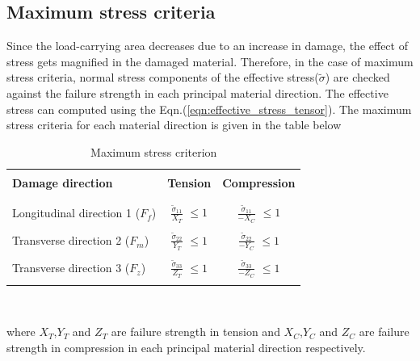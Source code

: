 \documentclass[a4paper,12pt,twoside]{report}
\begin{document}
\subsection{Maximum stress criteria}\label{Maximum stress criteria}
\indent\indent\indent  Since the load-carrying area decreases due to an increase in damage, the effect of stress gets magnified in the damaged material. Therefore, in the case of maximum stress criteria, normal stress components of the effective stress($\tilde{\sigma}$) are checked against the failure strength in each principal material direction. The effective stress can computed using the Eqn.(\ref{eqn:effective_stress_tensor}). The maximum stress criteria for each material direction is given in the table below\\
\begin{table}[htbp]
  \begin{center}
     \begin{tabular}{l  c  c} 
     \hline
     \\
      \textbf{Damage direction} \;\;& \textbf{Tension} \;& \textbf{Compression}\\
      \\
      \hline
      \\
      Longitudinal direction 1 ($F_{f}$) & \Large{$\frac{\tilde{\sigma}_{11}}{X_{T}} $}\small{ $\leq 1$} & \Large{$\frac{\tilde{\sigma}_{11}}{-X_{C}} $}\small{ $\leq 1$} \\
      \\
      Transverse direction 2 ($F_{m}$)  &  \Large{$\frac{\tilde{\sigma}_{22}}{Y_{T}} $}\small{ $\leq 1$}  & \Large{$\frac{\tilde{\sigma}_{22}}{-Y_{C}} $}\small{ $\leq 1$}\\
      \\
      Transverse direction 3 ($F_{z}$) &  \Large{$\frac{\tilde{\sigma}_{33}}{Z_{T}} $}\small{ $\leq 1$}  &   \Large{$\frac{\tilde{\sigma}_{33}}{-Z_{C}} $}\small{ $\leq 1$}\\
       \\
       \hline
    \end{tabular}
    \\
    \caption{Maximum stress criterion}
    \label{tab:Maximum stress criterion}
  \end{center}
\end{table}
\FloatBarrier
where $X_{T}$,$ Y_{T} $ and $Z_{T}$ are failure strength in tension and $X_{C}$,$ Y_{C} $ and $Z_{C}$ are failure strength in compression in each principal material direction respectively.\\
\\
\end{document}

